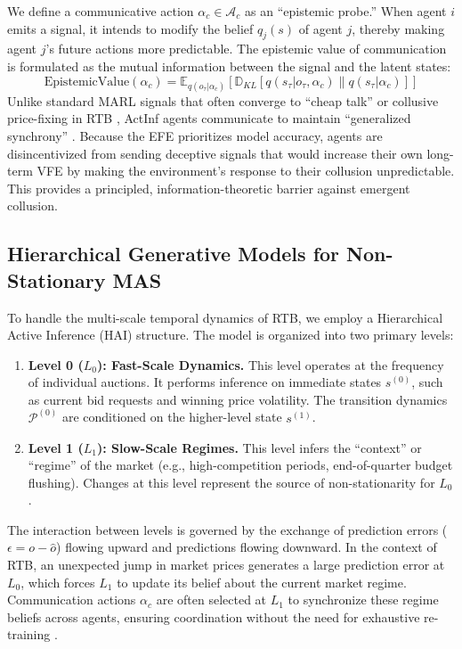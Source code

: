 We define a communicative action $\alpha_c \in \mathcal{A}_c$ as an ``epistemic probe.'' When agent $i$ emits a signal, it intends to modify the belief $q_j(s)$ of agent $j$, thereby making agent $j$'s future actions more predictable. The epistemic value of communication is formulated as the mutual information between the signal and the latent states:
\begin{equation}
    \text{EpistemicValue}(\alpha_c) = \mathbb{E}_{q(o_\tau | \alpha_c)} [ \mathbb{D}_{KL}[q(s_\tau | o_\tau, \alpha_c) \parallel q(s_\tau | \alpha_c)] ]
\end{equation}
Unlike standard MARL signals that often converge to ``cheap talk'' or collusive price-fixing in RTB \cite{zheng2022multiagent, brown2020language}, ActInf agents communicate to maintain ``generalized synchrony'' \cite{friston2015active}. Because the EFE prioritizes model accuracy, agents are disincentivized from sending deceptive signals that would increase their own long-term VFE by making the environment's response to their collusion unpredictable. This provides a principled, information-theoretic barrier against emergent collusion.

\subsection{Hierarchical Generative Models for Non-Stationary MAS}
\label{sec:hierarchical_model}

To handle the multi-scale temporal dynamics of RTB, we employ a Hierarchical Active Inference (HAI) structure. The model is organized into two primary levels:

\begin{enumerate}
    \item \textbf{Level 0 ($L_0$): Fast-Scale Dynamics.} This level operates at the frequency of individual auctions. It performs inference on immediate states $s^{(0)}$, such as current bid requests and winning price volatility. The transition dynamics $\mathcal{P}^{(0)}$ are conditioned on the higher-level state $s^{(1)}$.
    \item \textbf{Level 1 ($L_1$): Slow-Scale Regimes.} This level infers the ``context'' or ``regime'' of the market (e.g., high-competition periods, end-of-quarter budget flushing). Changes at this level represent the source of non-stationarity for $L_0$.
\end{enumerate}

The interaction between levels is governed by the exchange of prediction errors ($\epsilon = o - \hat{o}$) flowing upward and predictions flowing downward. In the context of RTB, an unexpected jump in market prices generates a large prediction error at $L_0$, which forces $L_1$ to update its belief about the current market regime. Communication actions $\alpha_c$ are often selected at $L_1$ to synchronize these regime beliefs across agents, ensuring coordination without the need for exhaustive re-training \cite{millidge2023mathematical}.

